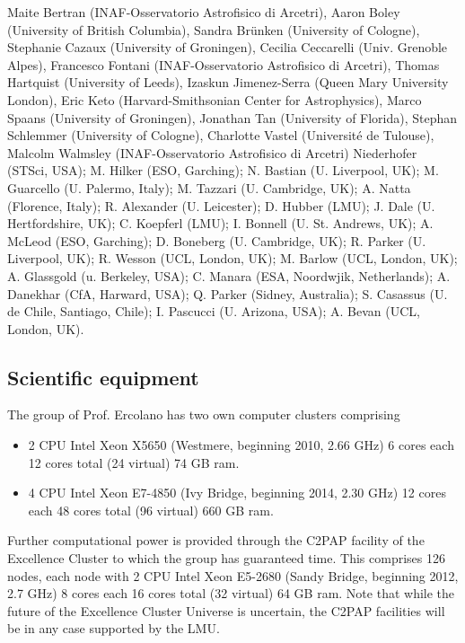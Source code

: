 \documentclass[10pt,fleqn,twoside]{article}
\newcommand{\Tcol}{\color{blue}}
\begin{document}
Maite Bertran (INAF-Osservatorio Astrofisico di Arcetri), Aaron Boley (University of British Columbia), Sandra Brünken (University of Cologne), Stephanie Cazaux (University of Groningen), Cecilia Ceccarelli (Univ. Grenoble Alpes), Francesco Fontani (INAF-Osservatorio Astrofisico di Arcetri), Thomas Hartquist (University of Leeds), Izaskun Jimenez-Serra (Queen Mary University London), Eric Keto (Harvard-Smithsonian Center for Astrophysics), Marco Spaans (University of Groningen), Jonathan Tan (University of Florida), Stephan Schlemmer (University of Cologne), Charlotte Vastel (Université de Tulouse), Malcolm Walmsley (INAF-Osservatorio Astrofisico di Arcetri)
 Niederhofer (STSci, USA); M. Hilker (ESO, Garching); N. Bastian (U. Liverpool,
UK); M. Guarcello (U. Palermo, Italy); M. Tazzari (U. Cambridge, UK);
A. Natta (Florence, Italy); R. Alexander (U. Leicester); D. Hubber
(LMU); J. Dale (U. Hertfordshire, UK); C. Koepferl (LMU); I. Bonnell
(U. St. Andrews, UK); A. McLeod (ESO, Garching); D. Boneberg
(U. Cambridge, UK); R. Parker (U. Liverpool, UK); R. Wesson (UCL,
London, UK); M. Barlow (UCL, London, UK); A. Glassgold (u. Berkeley,
USA); C. Manara (ESA, Noordwjik, Netherlands); A. Danekhar (CfA,
Harward, USA); Q. Parker (Sidney, Australia); S. Casassus
(U. de Chile, Santiago, Chile); I. Pascucci (U. Arizona, USA);
A. Bevan (UCL, London, UK).

\subsection{\Tcol Scientific equipment}

The group of Prof. Ercolano has two own computer clusters comprising 

\begin{itemize}
\item 2 CPU Intel Xeon X5650 (Westmere, beginning
2010, 2.66 GHz) 6 cores each 12 cores total (24 virtual) 74 GB ram.

\item 4 CPU Intel Xeon E7-4850 (Ivy Bridge, beginning 2014, 2.30 GHz)
12 cores each 48 cores total (96 virtual) 660 GB ram.

\end{itemize}

Further computational power is provided through the C2PAP facility of the Excellence Cluster to which
the group has guaranteed time. This comprises 126 nodes, each node with 2 CPU Intel Xeon E5-2680 (Sandy
Bridge, beginning 2012, 2.7 GHz) 8 cores each 16 cores total (32
virtual) 64 GB ram. Note that while the future of the Excellence
Cluster Universe is uncertain, the C2PAP facilities will be in any
case supported by the LMU. 
\end{document}
